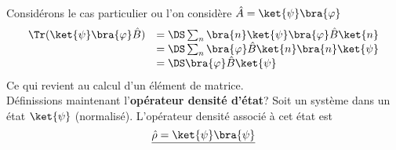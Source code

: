 Considérons le cas particulier ou l'on considère $\hat{A}=\ket{\psi}\bra{\varphi}$
\begin{equation}
\begin{array}{ll}
\Tr(\ket{\psi}\bra{\varphi}\hat{B}) &=\DS \sum_n \bra{n}\ket{\psi}\bra{\varphi}\hat{B}\ket{n}\\
&=\DS \sum_n \bra{\varphi}\hat{B}\ket{n}\bra{n}\ket{\psi} \\
&=\DS \bra{\varphi}\hat{B}\ket{\psi}
\end{array}
\end{equation}
Ce qui revient au calcul d'un élément de matrice.\\

Définissions maintenant l'\textbf{opérateur densité d'état}? Soit un système dans un état $\ket{\psi}$ (normalisé). L'opérateur densité associé à cet état est 
\begin{equation}
\underline{\hat{\rho} = \ket{\psi}\bra{\psi}}
\end{equation}
